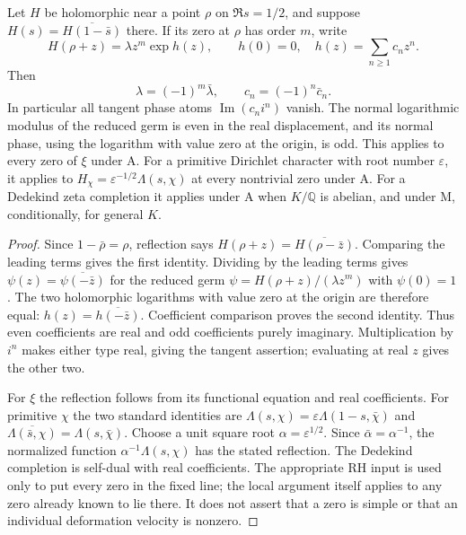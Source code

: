 \begin{theorem}[NN-S006]
Let $H$ be holomorphic near a point $\rho$ on $\Re s=1/2$, and
suppose $H(s)=\overline{H(1-\bar s)}$ there. If its zero at $\rho$
has order $m$, write
\[
 H(\rho+z)=\lambda z^m\exp h(z),\qquad
 h(0)=0,\quad h(z)=\sum_{n\geq1}c_nz^n.
\]
Then
\[
 \lambda=(-1)^m\bar\lambda,\qquad
 c_n=(-1)^n\bar c_n.                                  \tag{S006.1}
\]
In particular all tangent phase atoms
$\operatorname{Im}(c_ni^n)$ vanish. The normal logarithmic modulus
of the reduced germ is even in the real displacement, and its
normal phase, using the logarithm with value zero at the origin,
is odd.
This applies to every zero of $\xi$ under A. For a primitive
Dirichlet character with root number $\varepsilon$, it applies
to $H_\chi=\varepsilon^{-1/2}\Lambda(s,\chi)$ at every nontrivial
zero under A. For a Dedekind zeta completion it applies under A
when $K/\mathbb Q$ is abelian, and under M, conditionally, for
general $K$.
\end{theorem}

\begin{proof}
Since $1-\bar\rho=\rho$, reflection says
$H(\rho+z)=\overline{H(\rho-\bar z)}$. Comparing the leading
terms gives the first identity. Dividing by the leading terms
gives $\psi(z)=\overline{\psi(-\bar z)}$ for the reduced germ
$\psi=H(\rho+z)/(\lambda z^m)$ with $\psi(0)=1$.
The two holomorphic logarithms with value zero at the origin
are therefore equal: $h(z)=\overline{h(-\bar z)}$.
Coefficient comparison proves the second identity.
Thus even coefficients are real and odd coefficients purely
imaginary. Multiplication by $i^n$ makes either type real, giving
the tangent assertion; evaluating at real $z$ gives the other two.

For $\xi$ the reflection follows from its functional equation
and real coefficients. For primitive $\chi$ the two standard
identities are
$\Lambda(s,\chi)=\varepsilon\Lambda(1-s,\bar\chi)$ and
$\overline{\Lambda(\bar s,\chi)}=\Lambda(s,\bar\chi)$.
Choose a unit square root $\alpha=\varepsilon^{1/2}$.
Since $\bar\alpha=\alpha^{-1}$, the normalized function
$\alpha^{-1}\Lambda(s,\chi)$ has the stated reflection.
The Dedekind completion is self-dual with real coefficients.
The appropriate RH input is used only to put every zero in the
fixed line; the local argument itself applies to any zero already
known to lie there. It does not assert that a zero is simple or
that an individual deformation velocity is nonzero.
\end{proof}

